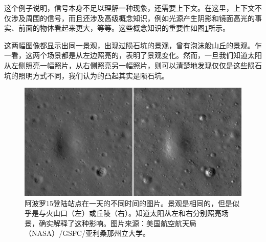 
这个例子说明，信号本身不足以理解一种现象，还需要上下文。在这里，上下文不仅涉及周围的信号，而且还涉及高级概念知识，例如光源产生阴影和镜面高光的事实、前面的物体看起来更大，等等。这些概念知识的重要性如图\ref{fig:craters}所示。


这两幅图像都显示出同一景观，出现过陨石坑的景观，曾有泡沫般山丘的景观。乍一看，这两个场景都是从左边照亮的，表明了景观变化。然而，一旦我们知道太阳从左侧照亮一幅照片，从右侧照亮另一幅照片，则可以清楚地发现仅仅是这些陨石坑的照明方式不同，我们认为的凸起其实是陨石坑。


\begin{figure}[!htb]
	\centering
		\includegraphics[width=\textwidth]{figs/craters}
	\caption{阿波罗15登陆站点在一天的不同时间的图片。景观是相同的，但是似乎是与火山口（左）或丘陵（右）。知道太阳从左和右分别照亮场景，确实解释了这种影响。图片来源：美国航空航天局（NASA）/GSFC/亚利桑那州立大学。
	\label{fig:craters}}
\end{figure}

